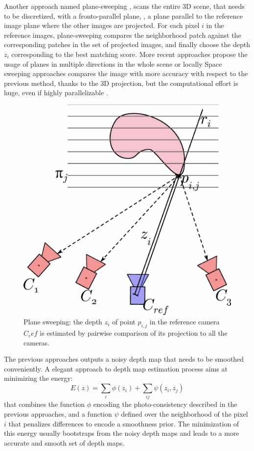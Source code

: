 Another approach named plane-sweeping \cite{collins1996space}, scans the entire 3D scene, that needs to be discretized, with a fronto-parallel plane, \ie, a plane parallel to the reference image plane where the other images are projected. 
For each pixel $i$ in the reference images, plane-sweeping compares the neighborhood patch against the corresponding patches in the set of projected images, and finally choose the depth $z_i$ corresponding to the best matching score. 
More recent approaches propose the usage of planes in multiple directions in the whole scene \cite{gallup2007real} or locally \cite{sinha2014efficient}
Space sweeping approaches compares the image with more accuracy with respect to the previous method, thanks to the 3D projection, but the computational effort is huge, even if highly parallelizable \cite{yang2003multi}.




\begin{figure}[t]
  \includegraphics[width=0.9\columnwidth]{./img/ch_soa/planesweeping}
 \caption{Plane sweeping: the depth $z_i$ of point $p_{i,j}$ in the reference camera $C_ref$ is estimated by pairwise comparison of its projection to all the cameras.}
 \label{fig:planesweeping}
\end{figure}




The previous approaches outputs a noisy depth map that needs to be smoothed conveniently. 
A elegant approach to depth map estimation process aims at minimizing the energy:
\begin{equation}
 \label{eq:depthenergy} 
 E(z) = \sum_i \phi(z_i)  + \sum_{ij} \psi(z_i,z_j)
\end{equation}
that combines the function $\phi$ encoding the photo-consistency described in the previous approaches, and a function $\psi$ defined over the neighborhood of the pixel $i$ that penalizes differences to encode a smoothness prior. 
The minimization of this energy usually bootstraps from the noisy depth maps and leads to a more accurate and smooth set of depth maps.


